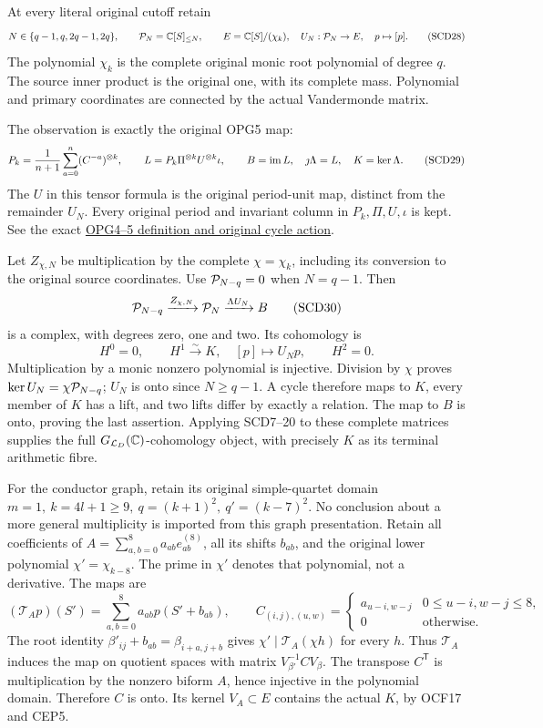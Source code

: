 At every literal original cutoff retain
\[
 N\in\{q-1,q,2q-1,2q\},\qquad
 \mathcal P_N=\mathbb C[S]_{\le N},\qquad E=\mathbb C[S]/(\chi_k),
 \quad U_N:\mathcal P_N\to E,\quad p\mapsto[p].
 \tag{SCD28}
\]
The polynomial \(\chi_k\) is the complete original monic root
polynomial of degree \(q\). The source inner product is the original
one, with its complete mass. Polynomial and primary coordinates
are connected by the actual Vandermonde matrix.

The observation is exactly the original OPG5 map:
\[
 P_k=\frac1{n+1}\sum_{a=0}^{n}(C^{-a})^{\otimes k},\qquad
 L=P_k\Pi^{\otimes k}U^{\otimes k}\iota,\qquad
 B=\operatorname{im} L,\quad\jmath\Lambda=L,\quad K=\ker\Lambda .
 \tag{SCD29}
\]
The \(U\) in this tensor formula is the original period-unit map,
distinct from the remainder \(U_N\). Every original period and
invariant column in \(P_k,\Pi,U,\iota\) is kept. See the exact
\href{https://github.com/KokunoYumeto/zeta-function-research-reader/blob/6cf5b3aa8ff395eba6b5512b28d117334da5767b/workbenches/splitzero-tandem/continuations/20260922-cutoff-profile/RETAINED_COMPLETE_PROOF_SOURCES.tex#L9420}{OPG4--5 definition and original cycle action}.

Let \(Z_{\chi,N}\) be multiplication by the complete \(\chi=\chi_k\),
including its conversion to the original source coordinates.
Use \(\mathcal P_{N-q}=0\) when \(N=q-1\). Then
\[
 \mathcal P_{N-q}\xrightarrow{Z_{\chi,N}}\mathcal P_N
                  \xrightarrow{\Lambda U_N}B
 \tag{SCD30}
\]
is a complex, with degrees zero, one and two. Its cohomology is
\[
 H^0=0,\qquad
 H^1\xrightarrow{\sim}K,\quad[p]\mapsto U_Np,\qquad H^2=0.
 \tag{SCD31}
\]
Multiplication by a monic nonzero polynomial is injective.
Division by \(\chi\) proves
\(\ker U_N=\chi\mathcal P_{N-q}\); \(U_N\) is onto since \(N\ge q-1\).
A cycle therefore maps to \(K\), every member of \(K\) has a lift,
and two lifts differ by exactly a relation. The map to \(B\)
is onto, proving the last assertion. Applying SCD7--20 to these
complete matrices supplies the full \(G_{\mathcal L_D}(\mathbb C)\)-cohomology
object, with precisely \(K\) as its terminal arithmetic fibre.

For the conductor graph, retain its original simple-quartet domain
\(m=1,\ k=4l+1\ge9,\ q=(k+1)^2,\ q'=(k-7)^2\).
No conclusion about a more general multiplicity is imported from
this graph presentation. Retain all coefficients of
\(A=\sum_{a,b=0}^8a_{ab}e_{ab}^{(8)}\), all its shifts \(b_{ab}\),
and the original lower polynomial \(\chi'=\chi_{k-8}\). The prime
in \(\chi'\) denotes that polynomial, not a derivative. The maps are
\[
 (\mathcal T_Ap)(S')=\sum_{a,b=0}^8a_{ab}p(S'+b_{ab}),\qquad
 C_{(i,j),(u,w)}=
 \begin{cases}a_{u-i,w-j}&0\le u-i,w-j\le8,\\
 0&\text{otherwise}.
 \end{cases}
 \tag{SCD32}
\]
The root identity \(\beta'_{ij}+b_{ab}=\beta_{i+a,j+b}\)
gives \(\chi'\mid\mathcal T_A(\chi h)\) for every \(h\).
Thus \(\mathcal T_A\) induces the map on quotient spaces with
matrix \(V_{\beta'}^{-1}CV_\beta\). The transpose \(C^{\mathsf T}\)
is multiplication by the nonzero biform \(A\), hence injective
in the polynomial domain. Therefore \(C\) is onto. Its kernel
\(V_A\subset E\) contains the actual \(K\), by OCF17 and CEP5.

